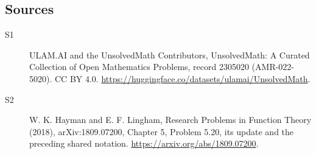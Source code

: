 \documentclass[11pt]{article}
\begin{document}
\subsection{Sources}
\begin{description}
\item[\hypertarget{source:2305020:1}{S1}] ULAM.AI and the UnsolvedMath Contributors, UnsolvedMath: A Curated Collection of Open Mathematics Problems, record 2305020 (AMR-022-5020). CC BY 4.0. \url{https://huggingface.co/datasets/ulamai/UnsolvedMath}.
\item[\hypertarget{source:2305020:2}{S2}] W. K. Hayman and E. F. Lingham, Research Problems in Function Theory (2018), arXiv:1809.07200, Chapter 5, Problem 5.20, its update and the preceding shared notation. \url{https://arxiv.org/abs/1809.07200}.
\end{description}
\label{end:2305020}
\end{document}
